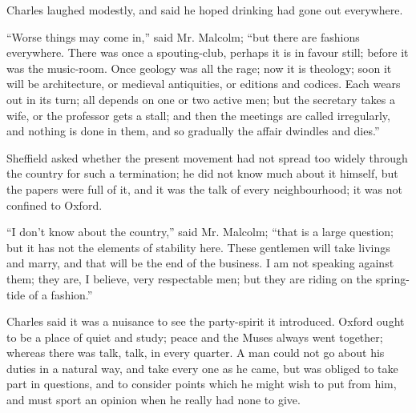 Charles laughed modestly, and said he hoped drinking had gone out
everywhere.

``Worse things may come in,'' said Mr. Malcolm; ``but
there are fashions everywhere. There was once a spouting-club, perhaps
it is in favour still; before it was the music-room. Once geology was
all the rage; now it is theology; soon it will be architecture, or
medieval antiquities, or editions and codices. Each wears out in its
turn; all depends on one or two active men; but the secretary takes a
wife, or the professor gets a stall; and then the meetings are called
irregularly, and nothing is done in them, and so gradually the affair
dwindles and dies.''

Sheffield asked whether the present movement had not spread too
widely through the country for such a termination; he did not know
much about it himself, but the papers were full of it, and it was the
talk of every neighbourhood; it was not confined to Oxford.

``I don't know about the country,'' said Mr. Malcolm;
``that is a large question; but it has not the elements of
stability here. These gentlemen will take livings and marry, and that
will be the end of the business. I am not speaking against them; they
are, I believe, very respectable men; but they are riding on the
spring-tide of a fashion.''

Charles said it was a nuisance to see the party-spirit it
introduced. Oxford ought to be a place of quiet and study; peace and
the Muses always went together; whereas there was talk, talk, in every
quarter. A man could not go about his duties in a natural way, and
take every one as he came, but was obliged to take part in questions,
and to consider points which he might wish to put from him, and must
sport an opinion when he really had none to give.

